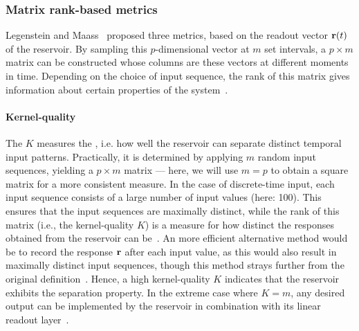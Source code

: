 \subsubsection{Matrix rank-based metrics} \label{sec:1:RC_metrics_KQ}
Legenstein and Maass~\cite{WhatMakesPowerful} proposed three metrics, based on the readout vector $\boldsymbol{\mathbf{r}}(t)$ of the reservoir.
By sampling this $p$-dimensional vector at $m$ set intervals, a $p \times m$ matrix can be constructed whose columns are these vectors at different moments in time.
Depending on the choice of input sequence, the rank of this matrix gives information about certain properties of the system~\cite{RC_ASI}.

\paragraph{Kernel-quality}
The  $K$ measures the , i.e. how well the reservoir can separate distinct temporal input patterns.
Practically, it is determined by applying $m$ random input sequences, yielding a $p \times m$ matrix --- here, we will use $m=p$ to obtain a square matrix for a more consistent measure.
In the case of discrete-time input, each input sequence consists of a large number of input values (here: 100).
This ensures that the input sequences are maximally distinct, while the rank of this matrix (i.e., the kernel-quality $K$) is a measure for how distinct the responses obtained from the reservoir can be~\cite{Vidamour_2022}.
An more efficient alternative method would be to record the response $\boldsymbol{\mathbf{r}}$ after each input value, as this would also result in maximally distinct input sequences, though this method strays further from the original definition~\cite{RC_HierarchicalNeuroevolution,RCbenchmarksReview1}.
Hence, a high kernel-quality $K$ indicates that the reservoir exhibits the separation property.
In the extreme case where $K=m$, any desired output can be implemented by the reservoir in combination with its linear readout layer~\cite{WhatMakesPowerful}.

